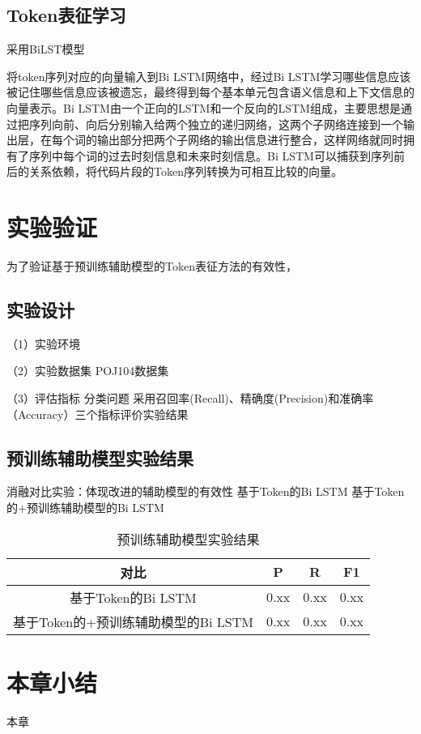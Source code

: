 \subsection{Token表征学习}
采用BiLST模型

将token序列对应的向量输入到Bi LSTM网络中，经过Bi LSTM学习哪些信息应该被记住哪些信息应该被遗忘，最终得到每个基本单元包含语义信息和上下文信息的向量表示。Bi LSTM由一个正向的LSTM和一个反向的LSTM组成，主要思想是通过把序列向前、向后分别输入给两个独立的递归网络，这两个子网络连接到一个输出层，在每个词的输出部分把两个子网络的输出信息进行整合，这样网络就同时拥有了序列中每个词的过去时刻信息和未来时刻信息。Bi LSTM可以捕获到序列前后的关系依赖，将代码片段的Token序列转换为可相互比较的向量。
\section{实验验证}
为了验证基于预训练辅助模型的Token表征方法的有效性，

\subsection{实验设计}
（1）实验环境

（2）实验数据集
POJ104数据集

（3）评估指标
分类问题 采用召回率(Recall)、精确度(Precision)和准确率（Accuracy）三个指标评价实验结果

\subsection{预训练辅助模型实验结果}
消融对比实验：体现改进的辅助模型的有效性
基于Token的Bi LSTM
基于Token的+预训练辅助模型的Bi LSTM


\begin{table}
  \centering
  \caption{预训练辅助模型实验结果} %
  \begin{tabular*}{0.9\textwidth}{@{\extracolsep{\fill}}cccc}
  \toprule
    对比			&P		&R		&F1 \\
  \midrule
    基于Token的Bi LSTM			&0.xx	&0.xx		&0.xx \\
    基于Token的+预训练辅助模型的Bi LSTM			&0.xx		&0.xx		&0.xx \\
  \bottomrule
  \end{tabular*}
\end{table}

\section{本章小结}
本章



